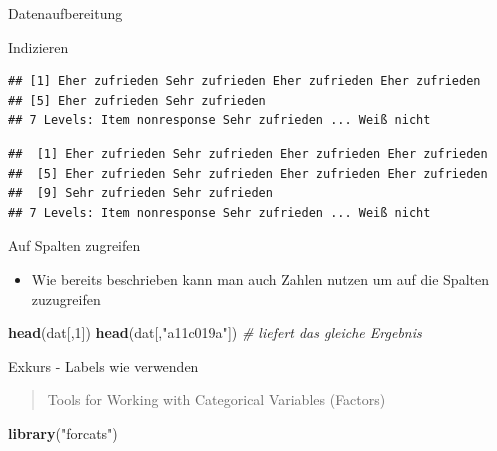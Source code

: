 \documentclass[ignorenonframetext,]{beamer}
\newenvironment{Shaded}{}{}
\newcommand{\KeywordTok}[1]{\textcolor[rgb]{0.00,0.44,0.13}{\textbf{{#1}}}}
\newcommand{\DecValTok}[1]{\textcolor[rgb]{0.25,0.63,0.44}{{#1}}}
\newcommand{\StringTok}[1]{\textcolor[rgb]{0.25,0.44,0.63}{{#1}}}
\newcommand{\CommentTok}[1]{\textcolor[rgb]{0.38,0.63,0.69}{\textit{{#1}}}}
\newcommand{\NormalTok}[1]{{#1}}
\providecommand{\tightlist}{%
\setlength{\itemsep}{0pt}\setlength{\parskip}{0pt}}
\begin{document}
\begin{frame}[fragile]{Datenaufbereitung}
\begin{block}{Indizieren}
\begin{verbatim}
## [1] Eher zufrieden Sehr zufrieden Eher zufrieden Eher zufrieden
## [5] Eher zufrieden Sehr zufrieden
## 7 Levels: Item nonresponse Sehr zufrieden ... Weiß nicht
\end{verbatim}

\begin{Shaded}
\end{Shaded}

\begin{verbatim}
##  [1] Eher zufrieden Sehr zufrieden Eher zufrieden Eher zufrieden
##  [5] Eher zufrieden Sehr zufrieden Eher zufrieden Eher zufrieden
##  [9] Sehr zufrieden Sehr zufrieden
## 7 Levels: Item nonresponse Sehr zufrieden ... Weiß nicht
\end{verbatim}

\end{block}

\begin{block}{Auf Spalten zugreifen}

\begin{itemize}
\tightlist
\item
  Wie bereits beschrieben kann man auch Zahlen nutzen um auf die Spalten
  zuzugreifen
\end{itemize}

\begin{Shaded}
\begin{Highlighting}[]
\KeywordTok{head}\NormalTok{(dat[,}\DecValTok{1}\NormalTok{])}
\KeywordTok{head}\NormalTok{(dat[,}\StringTok{"a11c019a"}\NormalTok{]) }\CommentTok{# liefert das gleiche Ergebnis}
\end{Highlighting}
\end{Shaded}

\end{block}

\begin{block}{Exkurs - Labels wie verwenden}

\begin{quote}
Tools for Working with Categorical Variables (Factors)
\end{quote}

\begin{Shaded}
\begin{Highlighting}[]
\KeywordTok{library}\NormalTok{(}\StringTok{"forcats"}\NormalTok{)}
\end{Highlighting}
\end{Shaded}


\end{block}
\end{frame}
\end{document}
